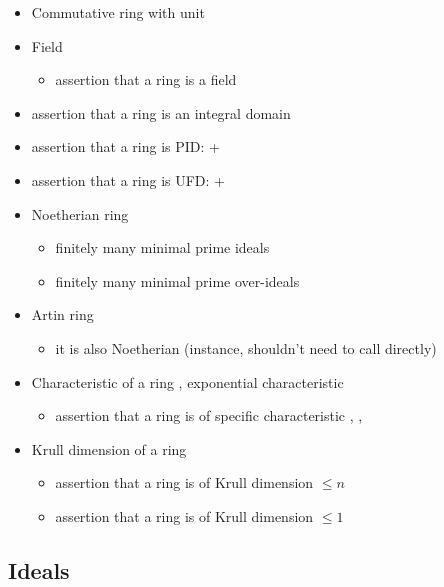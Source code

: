 \begin{itemize}
\item
Commutative ring with unit 
\item
Field 
\begin{itemize}
\item
assertion that a ring is a field 
\end{itemize}
\item
assertion that a ring is an integral domain 
\item
assertion that a ring is PID:  + 
\item
assertion that a ring is UFD:  + 
\item
Noetherian ring 
\begin{itemize}
\item
finitely many minimal prime ideals
\item
finitely many minimal prime over-ideals
\end{itemize}
\item
Artin ring 
\begin{itemize}
\item
it is also Noetherian 
(instance, shouldn't need to call directly)
\end{itemize}
\item
Characteristic of a ring , exponential characteristic 
\begin{itemize}
\item
assertion that a ring is of specific characteristic
, , 
\end{itemize}
\item
Krull dimension of a ring 
\begin{itemize}
\item
assertion that a ring is of Krull dimension $\leq n$
\item
assertion that a ring is of Krull dimension $\leq 1$
\end{itemize}
\end{itemize}

\subsection{Ideals}

